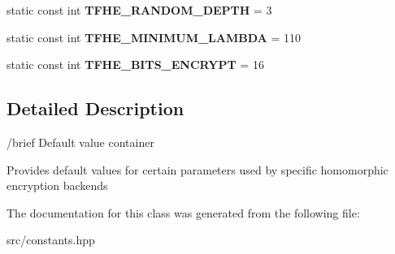 \begin{DoxyCompactItemize}
\item 
\mbox{\label{classhomomorphine_1_1_constants_aa8ea7bb198826c9458fe8b975c1dcd64}} 
static const int {\bfseries T\+F\+H\+E\+\_\+\+R\+A\+N\+D\+O\+M\+\_\+\+D\+E\+P\+TH} = 3
\item 
\mbox{\label{classhomomorphine_1_1_constants_a8581d42bf2a8ffa81c2760f7fdd3c8a3}} 
static const int {\bfseries T\+F\+H\+E\+\_\+\+M\+I\+N\+I\+M\+U\+M\+\_\+\+L\+A\+M\+B\+DA} = 110
\item 
\mbox{\label{classhomomorphine_1_1_constants_a7c01eca379ffe908e8b4b2bc22e2d24a}} 
static const int {\bfseries T\+F\+H\+E\+\_\+\+B\+I\+T\+S\+\_\+\+E\+N\+C\+R\+Y\+PT} = 16
\end{DoxyCompactItemize}


\subsection{Detailed Description}
/brief Default value container

Provides default values for certain parameters used by specific homomorphic encryption backends 

The documentation for this class was generated from the following file\+:\begin{DoxyCompactItemize}
\item 
src/constants.\+hpp\end{DoxyCompactItemize}
